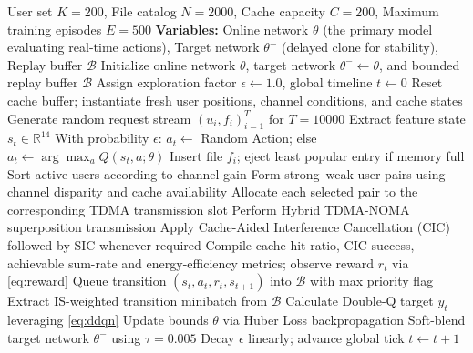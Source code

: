 \documentclass[conference]{IEEEtran}
\begin{document}
\begin{algorithm}
\caption{Hybrid Cache-Aware TDMA-NOMA Double Dueling DQN Cache Training}
\label{alg:dqn}
\begin{algorithmic}[1]
\REQUIRE User set $K=200$, File catalog $N=2000$, Cache capacity $C=200$, Maximum training episodes $E = 500$
\STATE \textbf{Variables:} Online network $\theta$ (the primary model evaluating real-time actions), Target network $\theta^-$ (delayed clone for stability), Replay buffer $\mathcal{B}$
\STATE Initialize online network $\theta$, target network $\theta^- \leftarrow \theta$, and bounded replay buffer $\mathcal{B}$
\STATE Assign exploration factor $\epsilon \leftarrow 1.0$, global timeline $t \leftarrow 0$
    \STATE Reset cache buffer; instantiate fresh user positions, channel conditions, and cache states
    \STATE Generate random request stream $(u_i, f_i)_{i=1}^{T}$ for $T=10000$
        \STATE Extract feature state $s_t \in \mathbb{R}^{14}$
        \STATE With probability $\epsilon$: $a_t \leftarrow$ Random Action; else $a_t \leftarrow \arg\max_a Q(s_t, a; \theta)$
            \STATE Insert file $f_i$; eject least popular entry if memory full
        \ENDIF
        \STATE Sort active users according to channel gain
        \STATE Form strong--weak user pairs using channel disparity and cache availability
        \STATE Allocate each selected pair to the corresponding TDMA transmission slot
        \STATE Perform Hybrid TDMA-NOMA superposition transmission
        \STATE Apply Cache-Aided Interference Cancellation (CIC) followed by SIC whenever required
        \STATE Compile cache-hit ratio, CIC success, achievable sum-rate and energy-efficiency metrics; observe reward $r_t$ via \eqref{eq:reward}
        \STATE Queue transition $(s_t, a_t, r_t, s_{t+1})$ into $\mathcal{B}$ with max priority flag
            \STATE Extract IS-weighted transition minibatch from $\mathcal{B}$
            \STATE Calculate Double-Q target $y_t$ leveraging \eqref{eq:ddqn}
            \STATE Update bounds $\theta$ via Huber Loss backpropagation
            \STATE Soft-blend target network $\theta^-$ using $\tau = 0.005$
        \ENDIF
        \STATE Decay $\epsilon$ linearly; advance global tick $t \leftarrow t + 1$
    \ENDFOR
\ENDFOR
\end{algorithmic}
\end{algorithm}
\end{document}
